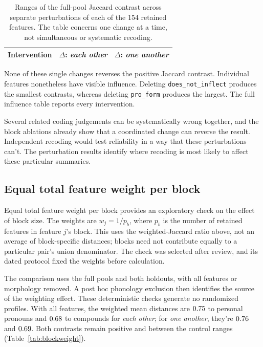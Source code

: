 \documentclass[12pt]{article}
\providecommand{\mention}[1]{\textit{#1}}
\begin{document}
\begin{table}[htbp]
\centering
\begin{tabular}{lrr}
\toprule
Intervention & $\Delta$: \mention{each other} & $\Delta$: \mention{one another} \\
\midrule

\end{tabular}
\caption{Ranges of the full-pool Jaccard contrast across separate perturbations of each of the 154 retained features. The table concerns one change at a time, not simultaneous or systematic recoding.}
\label{tab:coding}
\end{table}
\FloatBarrier

None of these single changes reverses the positive Jaccard contrast. Individual features nonetheless have visible influence. Deleting \texttt{does\_not\_inflect} produces the smallest contrasts, whereas deleting \texttt{pro\_form} produces the largest. The full influence table reports every intervention.

Several related coding judgements can be systematically wrong together, and the block ablations already show that a coordinated change can reverse the result. Independent recoding would test reliability in a way that these perturbations can't. The perturbation results identify where recoding is most likely to affect these particular summaries.

\subsection{Equal total feature weight per block}
\label{sec:blockweight}

Equal total feature weight per block provides an exploratory check on the effect of block size. The weights are $w_j=1/p_b$, where $p_b$ is the number of retained features in feature $j$'s block. This uses the weighted-Jaccard ratio above, not an average of block-specific distances; blocks need not contribute equally to a particular pair's union denominator. The check was selected after review, and its dated protocol fixed the weights before calculation.

The comparison uses the full pools and both holdouts, with all features or morphology removed. A post hoc phonology exclusion then identifies the source of the weighting effect. These deterministic checks generate no randomized profiles. With all features, the weighted mean distances are $0.75$ to personal pronouns and $0.68$ to compounds for \mention{each other}; for \mention{one another}, they're $0.76$ and $0.69$. Both contrasts remain positive and between the control ranges (Table~\ref{tab:blockweight}).
\end{document}
